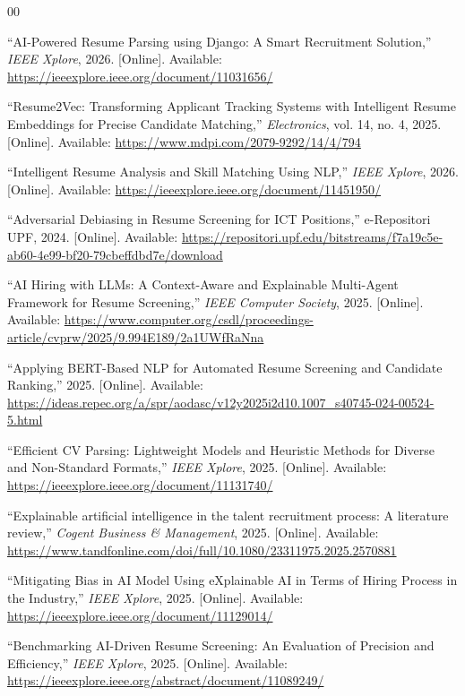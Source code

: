 \documentclass[conference]{IEEEtran}
\begin{document}
\begin{thebibliography}{00}

 ``AI-Powered Resume Parsing using Django: A Smart Recruitment Solution,'' \textit{IEEE Xplore}, 2026. [Online]. Available: \url{https://ieeexplore.ieee.org/document/11031656/}

 ``Resume2Vec: Transforming Applicant Tracking Systems with Intelligent Resume Embeddings for Precise Candidate Matching,'' \textit{Electronics}, vol. 14, no. 4, 2025. [Online]. Available: \url{https://www.mdpi.com/2079-9292/14/4/794}

 ``Intelligent Resume Analysis and Skill Matching Using NLP,'' \textit{IEEE Xplore}, 2026. [Online]. Available: \url{https://ieeexplore.ieee.org/document/11451950/}

 ``Adversarial Debiasing in Resume Screening for ICT Positions,'' e-Repositori UPF, 2024. [Online]. Available: \url{https://repositori.upf.edu/bitstreams/f7a19c5e-ab60-4e99-bf20-79cbeffdbd7e/download}

 ``AI Hiring with LLMs: A Context-Aware and Explainable Multi-Agent Framework for Resume Screening,'' \textit{IEEE Computer Society}, 2025. [Online]. Available: \url{https://www.computer.org/csdl/proceedings-article/cvprw/2025/9.994E189/2a1UWfRaNna}

 ``Applying BERT-Based NLP for Automated Resume Screening and Candidate Ranking,'' 2025. [Online]. Available: \url{https://ideas.repec.org/a/spr/aodasc/v12y2025i2d10.1007_s40745-024-00524-5.html}

 ``Efficient CV Parsing: Lightweight Models and Heuristic Methods for Diverse and Non-Standard Formats,'' \textit{IEEE Xplore}, 2025. [Online]. Available: \url{https://ieeexplore.ieee.org/document/11131740/}

 ``Explainable artificial intelligence in the talent recruitment process: A literature review,'' \textit{Cogent Business \& Management}, 2025. [Online]. Available: \url{https://www.tandfonline.com/doi/full/10.1080/23311975.2025.2570881}

 ``Mitigating Bias in AI Model Using eXplainable AI in Terms of Hiring Process in the Industry,'' \textit{IEEE Xplore}, 2025. [Online]. Available: \url{https://ieeexplore.ieee.org/document/11129014/}

 ``Benchmarking AI-Driven Resume Screening: An Evaluation of Precision and Efficiency,'' \textit{IEEE Xplore}, 2025. [Online]. Available: \url{https://ieeexplore.ieee.org/abstract/document/11089249/}


\end{thebibliography}
\end{document}
